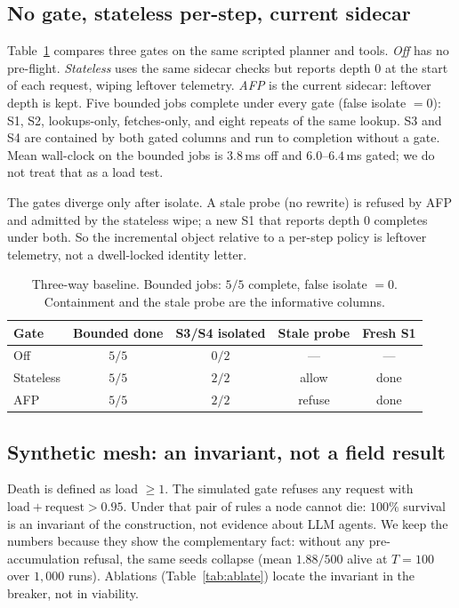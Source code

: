 \documentclass{article}
\begin{document}
\subsection{No gate, stateless per-step, current sidecar}
\label{app:baseline}

Table~\ref{tab:baseline} compares three gates on the same scripted planner and tools.
\emph{Off} has no pre-flight.
\emph{Stateless} uses the same sidecar checks but reports depth $0$ at the start of each request, wiping leftover telemetry.
\emph{AFP} is the current sidecar: leftover depth is kept.
Five bounded jobs complete under every gate (false isolate $=0$): S1, S2, lookups-only, fetches-only, and eight repeats of the same lookup.
S3 and S4 are contained by both gated columns and run to completion without a gate.
Mean wall-clock on the bounded jobs is $3.8$\,ms off and $6.0$--$6.4$\,ms gated; we do not treat that as a load test.

The gates diverge only after isolate.
A stale probe (no rewrite) is refused by AFP and admitted by the stateless wipe; a new S1 that reports depth $0$ completes under both.
So the incremental object relative to a per-step policy is leftover telemetry, not a dwell-locked identity letter.

\begin{table}[h]
\centering
\caption{Three-way baseline. Bounded jobs: $5/5$ complete, false isolate $=0$. Containment and the stale probe are the informative columns.}
\label{tab:baseline}
{\scriptsize
\begin{tabular}{lcccc}
\toprule
Gate & Bounded done & S3/S4 isolated & Stale probe & Fresh S1 \\
\midrule
Off & $5/5$ & $0/2$ & --- & --- \\
Stateless & $5/5$ & $2/2$ & allow & done \\
AFP & $5/5$ & $2/2$ & refuse & done \\
\bottomrule
\end{tabular}
}
\end{table}

\subsection{Synthetic mesh: an invariant, not a field result}
\label{app:mc}

Death is defined as load $\ge 1$.
The simulated gate refuses any request with $\mathrm{load}+\mathrm{request}>0.95$.
Under that pair of rules a node cannot die: $100\%$ survival is an invariant of the construction, not evidence about LLM agents.
We keep the numbers because they show the complementary fact: without any pre-accumulation refusal, the same seeds collapse (mean $1.88/500$ alive at $T=100$ over $1{,}000$ runs).
Ablations (Table~\ref{tab:ablate}) locate the invariant in the breaker, not in viability.
\end{document}
